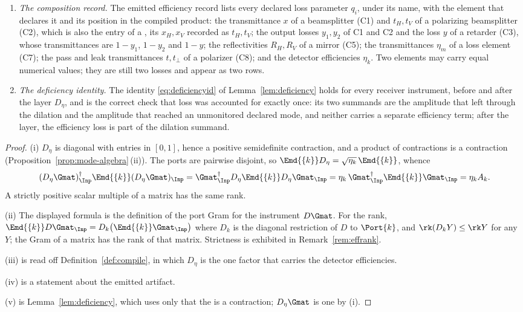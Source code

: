 \begin{theorem}
\begin{enumerate}[label=(\roman*),leftmargin=3.0em]
  is exactly one site at which it can enter.
\item \emph{The composition record.} The emitted efficiency record
  lists every declared loss parameter $q_i$, under its name, with the element
  that declares it and its position in the compiled product: the
  transmittance $x$ of a beamsplitter (C1) and $t_H,t_V$ of a polarizing
  beamsplitter (C2), which is also the entry of a
  , its $x_H,x_V$ recorded as
  $t_H,t_V$; the output losses $y_1,y_2$ of C1 and C2 and the loss $y$ of a
  retarder (C3), whose transmittances are $1-y_1$, $1-y_2$ and $1-y$; the
  reflectivities $R_H,R_V$ of a mirror (C5); the transmittances $\eta_m$ of a
  loss element (C7); the pass and leak transmittances $t,t_\perp$ of a
  polarizer (C8); and the detector efficiencies $\eta_k$. Two elements may
  carry equal numerical values; they are still two losses and appear as two
  rows.
\item \emph{The deficiency identity.} The identity \eqref{eq:deficiencyid} of
  Lemma~\ref{lem:deficiency} holds for every receiver instrument, before and
  after the layer $D_\eta$, and is the correct check that loss was accounted
  for exactly once: its two summands are the amplitude that left through the
  dilation and the amplitude that reached an unmonitored declared mode, and
  neither carries a separate efficiency term; after the layer, the efficiency
  loss is part of the dilation summand.
\end{enumerate}
\end{theorem}

\begin{proof}
(i) $D_\eta$ is diagonal with entries in $[0,1]$, hence a positive semidefinite
contraction, and a product of contractions is a contraction
(Proposition~\ref{prop:mode-algebra}\,(ii)). The ports are pairwise disjoint, so
$\Emd{\{k\}}D_\eta=\sqrt{\eta_k}\,\Emd{\{k\}}$, whence
\begin{equation}
  (D_\eta\Gmat)^\dagger_{\Inp}\Emd{\{k\}}(D_\eta\Gmat)_{\Inp}
  =\Gmat_{\Inp}^\dagger D_\eta\Emd{\{k\}}D_\eta\Gmat_{\Inp}
  =\eta_k\,\Gmat_{\Inp}^\dagger\Emd{\{k\}}\Gmat_{\Inp}=\eta_kA_k .
\end{equation}
A strictly positive scalar multiple of a matrix has the same rank.

(ii) The displayed formula is the definition of the port Gram for the
instrument $D\Gmat$. For the rank, $\Emd{\{k\}}D\Gmat_{\Inp}
=D_k\big(\Emd{\{k\}}\Gmat_{\Inp}\big)$ where $D_k$ is the diagonal
restriction of $D$ to $\Port{k}$, and $\rk(D_kY)\le\rk Y$ for any $Y$; the
Gram of a matrix has the rank of that matrix. Strictness is exhibited in
Remark~\ref{rem:effrank}.

(iii) is read off Definition~\ref{def:compile}, in which $D_\eta$ is the one
factor that carries the detector efficiencies.

(iv) is a statement about the emitted artifact.

(v) is Lemma~\ref{lem:deficiency}, which uses only that the
 is a contraction; $D_\eta\Gmat$ is one by (i).
\end{proof}
